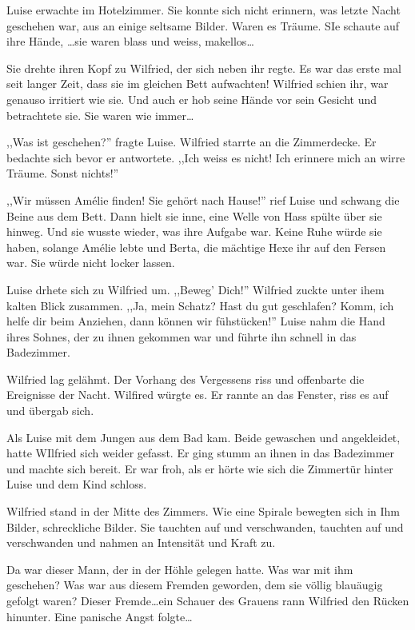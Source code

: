 Luise erwachte im Hotelzimmer. Sie konnte sich nicht erinnern, was letzte Nacht geschehen war, aus an einige seltsame Bilder. Waren es Träume. SIe schaute auf ihre Hände, \dots sie waren blass und weiss, makellos\dots

Sie drehte ihren Kopf zu Wilfried, der sich neben ihr regte. Es war das erste mal seit langer Zeit, dass sie im gleichen Bett aufwachten! Wilfried schien ihr, war genauso irritiert wie sie. Und auch er hob seine Hände vor sein Gesicht und betrachtete sie. Sie waren wie immer\dots

,,Was ist geschehen?'' fragte Luise. Wilfried starrte an die Zimmerdecke. Er bedachte sich bevor er antwortete. ,,Ich weiss es nicht! Ich erinnere mich an wirre Träume. Sonst nichts!''

,,Wir müssen Amélie finden! Sie gehört nach Hause!'' rief Luise und schwang die Beine aus dem Bett. Dann hielt sie inne, eine Welle von Hass spülte über sie hinweg. Und sie wusste wieder, was ihre Aufgabe war. Keine Ruhe würde sie haben, solange Amélie lebte und Berta, die mächtige Hexe ihr auf den Fersen war. Sie würde nicht locker lassen.

Luise drhete sich zu Wilfried um. ,,Beweg' Dich!'' Wilfried zuckte unter ihem kalten Blick zusammen. ,,Ja, mein Schatz? Hast du gut geschlafen? Komm, ich helfe dir beim Anziehen, dann können wir fühstücken!'' Luise nahm die Hand ihres Sohnes, der zu ihnen gekommen war und führte ihn schnell in das Badezimmer.

Wilfried lag gelähmt. Der Vorhang des Vergessens riss und offenbarte die Ereignisse der Nacht. Wilfired würgte es. Er rannte an das Fenster, riss es auf und übergab sich. 

Als Luise mit dem Jungen aus dem Bad kam. Beide gewaschen und angekleidet, hatte WIlfried sich weider gefasst. Er ging stumm an ihnen in das Badezimmer und machte sich bereit. Er war froh, als er hörte wie sich die Zimmertür hinter Luise und dem Kind schloss.

Wilfried stand in der Mitte des Zimmers. Wie eine Spirale bewegten sich in Ihm Bilder, schreckliche Bilder. Sie tauchten auf und verschwanden, tauchten auf und verschwanden und nahmen an Intensität und Kraft zu.

Da war dieser Mann, der in der Höhle gelegen hatte. Was war mit ihm geschehen? Was war aus diesem Fremden geworden, dem sie völlig blauäugig gefolgt waren? Dieser Fremde\dots ein Schauer des Grauens rann Wilfried den Rücken hinunter. Eine panische Angst folgte\dots

